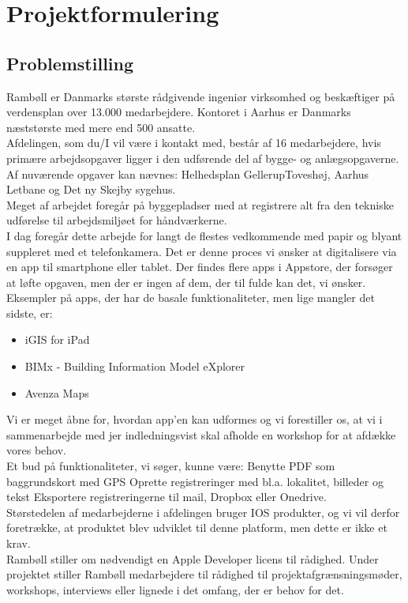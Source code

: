 \chapter{Projektformulering}


\section{Problemstilling}
Rambøll er Danmarks største rådgivende ingeniør virksomhed og beskæftiger på verdensplan over 13.000
medarbejdere. Kontoret i Aarhus er Danmarks næststørste med mere end 500 ansatte.\\
Afdelingen, som du/I vil være i kontakt med, består af 16 medarbejdere, hvis primære arbejdsopgaver ligger i
den udførende del af bygge- og anlægsopgaverne. Af nuværende opgaver kan nævnes: Helhedsplan GellerupToveshøj,
Aarhus Letbane og Det ny Skejby sygehus.\\
Meget af arbejdet foregår på byggepladser med at registrere alt fra den tekniske udførelse til arbejdsmiljøet for
håndværkerne.\\
I dag foregår dette arbejde for langt de flestes vedkommende med papir og blyant suppleret med et
telefonkamera.
Det er denne proces vi ønsker at digitalisere via en app til smartphone eller tablet.
Der findes flere apps i Appstore, der forsøger at løfte opgaven, men der er ingen af dem, der til fulde kan det, vi
ønsker. Eksempler på apps, der har de basale funktionaliteter, men lige mangler det sidste, er:
\begin{itemize}[-]
	\item iGIS for iPad 
	\item BIMx - Building Information Model eXplorer
	\item Avenza Maps
\end{itemize}

Vi er meget åbne for, hvordan app’en kan udformes og vi forestiller os, at vi i sammenarbejde med jer indledningsvist skal afholde en workshop for at afdække vores behov.\\
Et bud på funktionaliteter, vi søger, kunne være:
Benytte PDF som baggrundskort med GPS
Oprette registreringer med bl.a. lokalitet, billeder og tekst
Eksportere registreringerne til mail, Dropbox eller Onedrive.\\
Størstedelen af medarbejderne i afdelingen bruger IOS produkter, og vi vil derfor foretrække, at produktet blev
udviklet til denne platform, men dette er ikke et krav. \\
Rambøll stiller om nødvendigt en Apple Developer licens til rådighed.
Under projektet stiller Rambøll medarbejdere til rådighed til projektafgrænsningsmøder, workshops, interviews
eller lignede i det omfang, der er behov for det. 